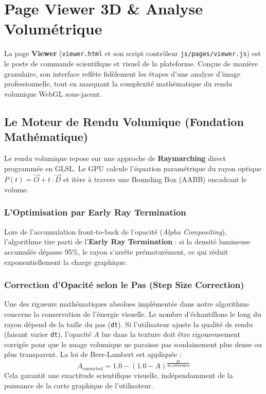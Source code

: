 \chapter{Page Viewer 3D \& Analyse Volumétrique}
\label{chap:viewer}

La page \textbf{Viewer} (\texttt{viewer.html} et son script contrôleur \texttt{js/pages/viewer.js}) est le poste de commande scientifique et visuel de la plateforme. Conçue de manière granulaire, son interface reflète fidèlement les étapes d'une analyse d'image professionnelle, tout en masquant la complexité mathématique du rendu volumique WebGL sous-jacent.

\section{Le Moteur de Rendu Volumique (Fondation Mathématique)}

Le rendu volumique repose sur une approche de \textbf{Raymarching} direct programmée en GLSL. Le GPU calcule l'équation paramétrique du rayon optique $P(t) = \vec{O} + t \cdot \vec{D}$ et itère à travers une Bounding Box (AABB) encadrant le volume.

\subsection{L'Optimisation par Early Ray Termination}
Lors de l'accumulation front-to-back de l'opacité (\textit{Alpha Compositing}), l'algorithme tire parti de l'\textbf{Early Ray Termination} : si la densité lumineuse accumulée dépasse 95\%, le rayon s'arrête prématurément, ce qui réduit exponentiellement la charge graphique.

\subsection{Correction d'Opacité selon le Pas (Step Size Correction)}
Une des rigueurs mathématiques absolues implémentée dans notre algorithme concerne la conservation de l'énergie visuelle. Le nombre d'échantillons le long du rayon dépend de la taille du pas (\texttt{dt}). Si l'utilisateur ajuste la qualité de rendu (faisant varier \texttt{dt}), l'opacité $A$ lue dans la texture doit être rigoureusement corrigée pour que le nuage volumique ne paraisse pas soudainement plus dense ou plus transparent. La loi de Beer-Lambert est appliquée :
\begin{equation}
A_{\text{corrected}} = 1.0 - (1.0 - A)^{\frac{\texttt{dt}}{\texttt{dt\_reference}}}
\end{equation}
Cela garantit une exactitude scientifique visuelle, indépendamment de la puissance de la carte graphique de l'utilisateur.

